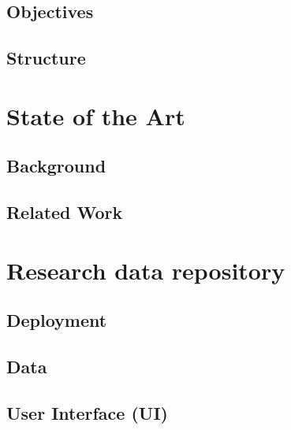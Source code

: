 \documentclass[12pt]{report}
\begin{document}
    \section{Objectives}
        
        
    \section{Structure}
        

\chapter{State of the Art}

    
    
    \section{Background}
    
        
            
    \section{Related Work}
    
        

        
\chapter{Research data repository}

    

    \section{Deployment}
    
        

    \section{Data}
    
        
        
    \section{User Interface (UI)}
    
\end{document}
